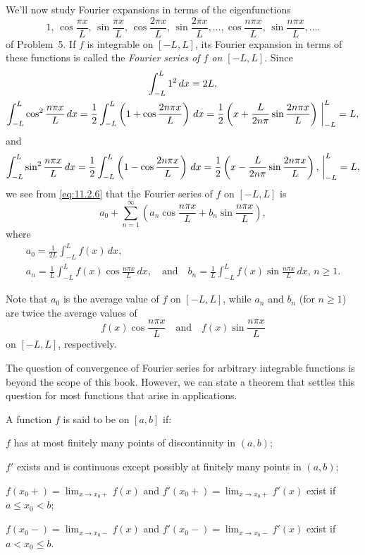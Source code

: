 We'll now study Fourier expansions in terms
 of the eigenfunctions
\[
1,\, \cos\frac{\pi x}{L},\, \sin\frac{\pi x}{L},
\, \cos\frac{2\pi x}{L}, \, \sin\frac{2\pi x}{L},\dots,
\cos\frac{n\pi x}{L}, \, \sin\frac{n\pi x}{L},\dots.
\]
of Problem~5.
 If $f$ is integrable on $[-L,L]$,  its
Fourier expansion in terms of these functions is called the
\emph{\color{blue}Fourier series of $f$ on $[-L,L]$}.  Since
\begin{gather*}
\int_{-L}^L 1^2\,dx=2L,\\
\int_{-L}^L\cos^2\frac{n\pi x}{L}\,dx =
\frac{1}{2}\int_{-L}^L\left(1+\cos\frac{2n\pi x}{L}\right)\,dx=
\frac{1}{2}\left(x+\frac{L}{2n\pi}\sin\frac{2n\pi x}{L}\right)
\,\bigg|_{-L}^{L}=L,
\end{gather*}
and
\[
\int_{-L}^L\sin^2\frac{n\pi x}{L}\,dx =
\frac{1}{2}\int_{-L}^L\left(1-\cos\frac{2n\pi x}{L}\right)\,dx=
\frac{1}{2}\left(x-\frac{L}{2n\pi}\sin\frac{2n\pi x}{L}\right),
\,\bigg|_{-L}^{L}=L,
\]
we see from \eqref{eq:11.2.6} that the Fourier series of $f$ on $[-L,L]$ is
\[
 a_0+\sum_{n=1}^\infty \left(a_n\cos\frac{n\pi x}{L}+b_n\sin\frac{n\pi x}{L}\right),
\]
where
\begin{gather*}
a_0=\frac{1}{2L}\int_{-L}^L f(x)\,dx,\\
a_n= \frac{1}{L}\int_{-L}^L f(x)\cos\frac{n\pi
x}{L}\,dx,\quad\text{and}\quad
b_n=\frac{1}{L}\int_{-L}^L f(x)\sin\frac{n\pi x}{L}\,dx,\,n\ge1.
\end{gather*}

Note that
$a_0$ is the average value of $f$ on $[-L,L]$, while $a_n$ and $b_n$
(for $n\ge1$) are twice the average values of
\[
f(x)\cos\frac{n\pi x}{L}\quad\text{and}\quad f(x)\sin\frac{n\pi x}{L}
\]
on $[-L,L]$, respectively.



The  question of convergence of Fourier series for arbitrary
integrable functions is beyond the scope of this book. However, we can
state a theorem that settles this question for most functions that
arise in applications.

\begin{definition}\label{thmtype:11.2.3}
A function  $f$ is said to be
 on $[a,b]$ if:
\begin{alist}
\item %
$f$ has at most finitely many points of discontinuity in $(a,b)$;
\item %
$f'$ exists and is continuous except possibly at finitely many points
in $(a,b)$;
\item %
$f(x_0+)=\lim_{x\to x_0+}f(x)$ and
$f'(x_0+)=\lim_{x\to x_0+}f'(x)$ exist if $a\le x_0<b$;
\item %
$f(x_0-)=\lim_{x\to x_0-}f(x)$ and
$f'(x_0-)=\lim_{x\to x_0-}f'(x)$ exist if  $a< x_0\le b$.
\end{alist}
\end{definition}

